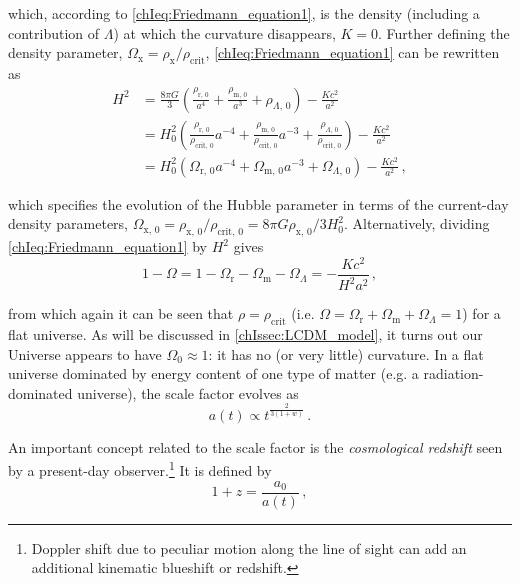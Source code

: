 \noindent which, according to \cref{chIeq:Friedmann_equation1}, is the density (including a contribution of $\Lambda$) at which the curvature disappears, $K = 0$. Further defining the density parameter, $\Omega_\text{x} = \rho_\text{x} / \rho_\text{crit}$, \cref{chIeq:Friedmann_equation1} can be rewritten as
\begin{align}
    \label{chIeq:Friedmann_equation1_alt1}
    H^2 & = \frac{8 \pi G}{3} \left( \frac{\rho_{\text{r}, \, 0}}{a^4} + \frac{\rho_{\text{m}, \, 0}}{a^3} + \rho_{\Lambda, \, 0} \right) - \frac{K c^2}{a^2} \nonumber
    \\
    & = H_0^2 \left( \frac{\rho_{\text{r}, \, 0}}{\rho_{\text{crit}, \, 0}} a^{-4} + \frac{\rho_{\text{m}, \, 0}}{\rho_{\text{crit}, \, 0}} a^{-3} + \frac{\rho_{\Lambda, \, 0}}{\rho_{\text{crit}, \, 0}} \right) - \frac{K c^2}{a^2} \nonumber
    \\
    & = H_0^2 \left( \Omega_{\text{r}, \, 0} a^{-4} + \Omega_{\text{m}, \, 0} a^{-3} + \Omega_{\Lambda, \, 0} \right) - \frac{K c^2}{a^2} \, ,
\end{align}

\noindent which specifies the evolution of the Hubble parameter in terms of the current-day density parameters, $\Omega_{\text{x}, \, 0} = \rho_{\text{x}, \, 0} / \rho_{\text{crit}, \, 0} = 8 \pi G \rho_{\text{x}, \, 0} / 3 H_0^2$. Alternatively, dividing \cref{chIeq:Friedmann_equation1} by $H^2$ gives
\begin{equation}
    \label{chIeq:Friedmann_equation1_alt2}
    1 - \Omega = 1 - \Omega_\text{r} - \Omega_\text{m} - \Omega_\Lambda = - \frac{K c^2}{H^2 a^2} \, ,
\end{equation}

\noindent from which again it can be seen that $\rho = \rho_\text{crit}$ (i.e. $\Omega = \Omega_\text{r} + \Omega_\text{m} + \Omega_\Lambda = 1$) for a flat universe. As will be discussed in \cref{chIssec:LCDM_model}, it turns out our Universe appears to have $\Omega_0 \approx 1$: it has no (or very little) curvature. In a flat universe dominated by energy content of one type of matter (e.g. a radiation-dominated universe), the scale factor evolves as
\begin{equation}
    \label{chIeq:Scale_factor}
    a(t) \propto t^\frac{2}{3(1+w)} \, .
\end{equation}

An important concept related to the scale factor is the \textit{cosmological redshift} seen by a present-day observer.\footnote{Doppler shift due to peculiar motion along the line of sight can add an additional kinematic blueshift or redshift.} It is defined by
\begin{equation}
    \label{chIeq:Redshift}
    1 + z = \frac{a_0}{a(t)} \, ,
\end{equation}

